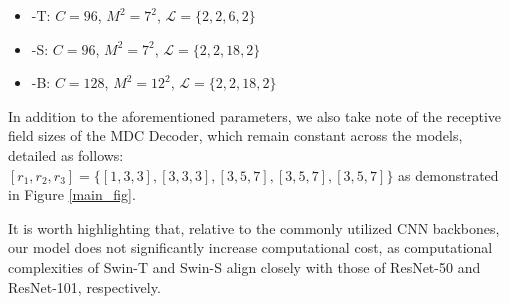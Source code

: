 \documentclass[journal]{IEEEtran}
\begin{document}
\begin{itemize}
    \item \model-T: $C=96$, $M^2=7^2$, $\mathcal{L} = \{2,2,6,2\}$ \item \model-S: $C=96$, $M^2=7^2$, $\mathcal{L} = \{2,2,18,2\}$ \item \model-B: $C=128$, $M^2=12^2$, $\mathcal{L} = \{2,2,18,2\}$ \end{itemize}

In addition to the aforementioned parameters, we also take note of the receptive field sizes of the MDC Decoder, which remain constant across the models, detailed as follows: $[r_1,r_2,r_3] = \{[1,3,3], [3,3,3], [3,5,7], [3,5,7], [3,5,7]\}$ as demonstrated in Figure \ref{main_fig}.

It is worth highlighting that, relative to the commonly utilized CNN backbones, our model does not significantly increase computational cost, as computational complexities of Swin-T and Swin-S align closely with those of ResNet-50 and ResNet-101, respectively.




\newcommand{\lovedaResults}[8]{#1& #2& #3& #4& #5& #6& #7& #8}
\end{document}
